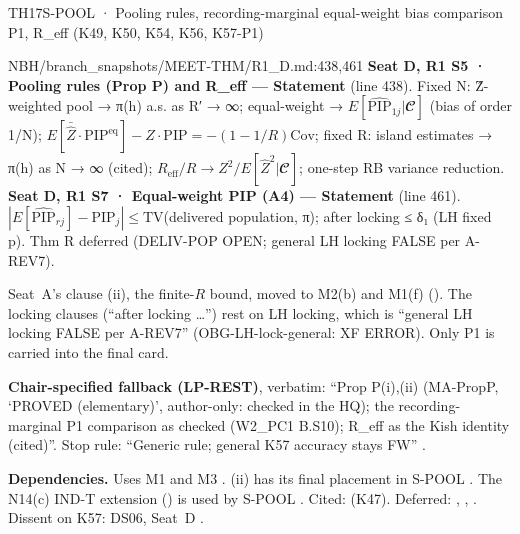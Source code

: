 \begin{card}{TH17}{S-POOL · Pooling rules, recording-marginal equal-weight bias comparison P1, R\_eff (K49, K50, K54, K56, K57-P1)}
\begin{stmt}{NBH/branch_snapshots/MEET-THM/R1_D.md:438,461}
\textbf{Seat D, R1 S5 · Pooling rules (Prop P) and R\_eff — Statement} (line 438). Fixed N: Ẑ-weighted pool → π(h) a.s. as R′ → ∞; equal-weight → $E[\widehat{\mathrm{PIP}}_{1j}|𝓒]$ (bias of order 1/N); $E[\bar{\hat{Z}}\cdot\mathrm{PIP}^{\mathrm{eq}}] − Z\cdot\mathrm{PIP} = −(1−1/R)\mathrm{Cov}$; fixed R: island estimates → π(h) as N → ∞ (cited); $R_{\mathrm{eff}}/R → Z^2/E[\hat{Z}^2|𝓒]$; one-step RB variance reduction.\\
\textbf{Seat D, R1 S7 · Equal-weight PIP (A4) — Statement} (line 461). $|E[\widehat{\mathrm{PIP}}_{rj}] − \mathrm{PIP}_j| ≤ \mathrm{TV}$(delivered population, π); after locking ≤ δ₁ (LH fixed p). Thm R deferred (DELIV-POP OPEN; general LH locking FALSE per A-REV7).
\end{stmt}
Seat~A's clause (ii), the finite-$R$ bound, moved to M2(b) and M1(f) (). The locking clauses (``after locking \ldots'') rest on LH locking, which is ``general LH locking FALSE per A-REV7'' (OBG-LH-lock-general: XF ERROR). Only P1 is carried into the final card.

\textbf{Chair-specified fallback (LP-REST)}, verbatim: ``Prop P(i),(ii) (MA-PropP, `PROVED (elementary)', author-only: checked in the HQ); the recording-marginal P1 comparison as checked (W2\_PC1 B.S10); R\_eff as the Kish identity (cited)''. Stop rule: ``Generic rule; general K57 accuracy stays FW'' .

\textbf{Dependencies.} Uses M1 and M3 . (ii) has its final placement in S-POOL . The N14(c) IND-T extension () is used by S-POOL . Cited:  (K47). Deferred: , , . Dissent on K57: DS06, Seat~D .


\end{card}
